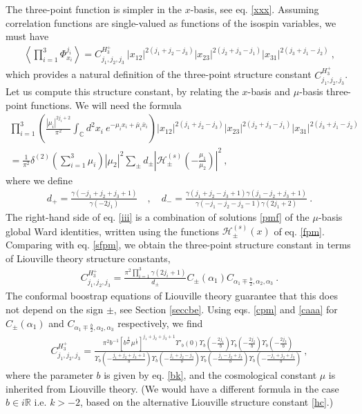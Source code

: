 \documentclass[12pt, a4paper, notitlepage, twoside]{report}
\numberwithin{equation}{section}
\theoremstyle{break}
\begin{document}
The three-point function is simpler in the $x$-basis, see eq. \eqref{xxx}.
Assuming correlation functions are single-valued as functions of the isospin variables, we must have
\begin{align}
  \left\langle \prod_{i=1}^3 \Phi^{j_i}_{x_i} \right\rangle = C^{H_3^+}_{j_1,j_2,j_3}\ |x_{12}|^{2(j_1+j_2-j_3)} |x_{23}|^{2(j_2+j_3-j_1)} |x_{31}|^{2(j_3+j_1-j_2)}\ ,
\label{ch}
\end{align}
which provides a natural definition of the three-point structure constant $C^{H_3^+}_{j_1,j_2,j_3}$.
Let us compute this structure constant, by relating the $x$-basis and $\mu$-basis three-point functions. We will need the formula \cite{rt05}
\begin{multline}
 \prod_{i=1}^3\left(\frac{|\mu_i|^{2j_i+2}}{\pi^2}\int_{{\mathbb{C}}}d^2x_i\ e^{-\mu_ix_i+\bar{\mu}_i\bar{x}_i}\right)
|x_{12}|^{2(j_1+j_2-j_3)} |x_{23}|^{2(j_2+j_3-j_1)} |x_{31}|^{2(j_3+j_1-j_2)} 
\\
= \frac{1}{\pi^2}\delta^{(2)}(\textstyle{\sum}_{i=1}^3\mu_i)|\mu_2|^2 \sum_\pm d_\pm \left|\mathcal{H}^{(s)}_\pm(-\tfrac{\mu_1}{\mu_2})\right|^2 \ ,
\label{iii}
\end{multline}
where we define 
\begin{align}
 d_+ = \frac{\gamma(-j_1+j_2+j_3+1)}{\gamma(-2j_1)} \quad , \quad d_- = \frac{\gamma(j_1+j_2-j_3+1)\gamma(j_1-j_2+j_3+1)}{\gamma(-j_1-j_2-j_3-1)\gamma(2j_1+2)}\ .
\end{align}
The right-hand side of eq. \eqref{iii} is a combination of solutions \eqref{pmf} of the $\mu$-basis global Ward identities, written using the functions $\mathcal{H}^{(s)}_\pm(x)$ of eq. \eqref{fpm}.
Comparing with eq. \eqref{sfpm}, we obtain the three-point structure constant in terms of Liouville theory structure constants,
\begin{align}
 C^{H_3^+}_{j_1,j_2,j_3} = \frac{\pi^2\prod_{i=1}^3\gamma(2j_i+1)}{d_\pm}C_{\pm}(\alpha_1)C_{\alpha_1\mp \frac{b}{2},\alpha_2,\alpha_3}\ .
\end{align}
The conformal boostrap equations of Liouville theory guarantee that this does not depend on the sign $\pm$, see Section \ref{seccbe}.
Using eqs. \eqref{cpm} and \eqref{caaa} for $C_{\pm}(\alpha_1)$ and $C_{\alpha_1\mp \frac{b}{2},\alpha_2,\alpha_3}$ respectively, we find
\begin{align}
\boxed{C^{H_3^+}_{j_1,j_2,j_3} = \frac{\pi^2b^{-1}\left[b^{\frac{2}{b^2}}\mu^{\frac{1}{b}}\right]^{j_1+j_2+j_3+1} \Upsilon'_b(0)\Upsilon_b(-\frac{2j_1}{b})\Upsilon_b(-\frac{2j_2}{b})\Upsilon_b(-\frac{2j_3}{b})}
{\Upsilon_b(-\frac{j_1+j_2+j_3+1}{b})\Upsilon_b(-\frac{j_1+j_2-j_3}{b}) \Upsilon_b(-\frac{j_1-j_2+j_3}{b})\Upsilon_b(-\frac{-j_1+j_2+j_3}{b})}}\ ,
\label{chp}
\end{align}
where the parameter $b$ is given by eq. \eqref{bk}, and the cosmological constant $\mu$ is inherited from Liouville theory.
(We would have a different formula in the case $b\in i\mathbb{R}$ i.e. $k>-2$, based on the alternative Liouville structure constant \eqref{hc}.)
\end{document}
